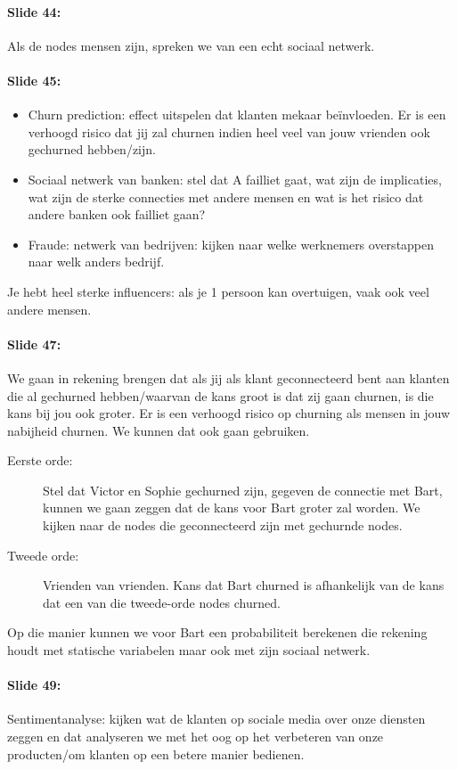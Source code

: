 \documentclass[10pt,a4paper]{report}
\begin{document}
\paragraph{Slide 44:}Als de nodes mensen zijn, spreken we van een echt sociaal netwerk.

\paragraph{Slide 45:}
\begin{itemize}
\item Churn prediction: effect uitspelen dat klanten mekaar beïnvloeden. Er is een verhoogd risico dat jij zal churnen indien heel veel van jouw vrienden ook gechurned hebben/zijn. 
\item Sociaal netwerk van banken: stel dat A failliet gaat, wat zijn de implicaties, wat zijn de sterke connecties met andere mensen en wat is het risico dat andere banken ook failliet gaan?
\item Fraude: netwerk van bedrijven: kijken naar welke werknemers overstappen naar welk anders bedrijf.
\end{itemize}
Je hebt heel sterke influencers: als je 1 persoon kan overtuigen, vaak ook veel andere mensen.

\paragraph{Slide 47:}We gaan in rekening brengen dat als jij als klant geconnecteerd bent aan klanten die al gechurned hebben/waarvan de kans groot is dat zij gaan churnen, is die kans bij jou ook groter. Er is een verhoogd risico op churning als mensen in jouw nabijheid churnen. We kunnen dat ook gaan gebruiken. 
\begin{description}
\item[Eerste orde:]Stel dat Victor en Sophie gechurned zijn, gegeven de connectie met Bart, kunnen we gaan zeggen dat de kans voor Bart groter zal worden. We kijken naar de nodes die geconnecteerd zijn met gechurnde nodes.
\item[Tweede orde:]Vrienden van vrienden. Kans dat Bart churned is afhankelijk van de kans dat een van die tweede-orde nodes churned.
\end{description}
Op die manier kunnen we voor Bart een probabiliteit berekenen die rekening houdt met statische variabelen maar ook met zijn sociaal netwerk.

\paragraph{Slide 49:}Sentimentanalyse: kijken wat de klanten op sociale media over onze diensten zeggen en dat analyseren we met het oog op het verbeteren van onze producten/om klanten op een betere manier bedienen.
\end{document}
